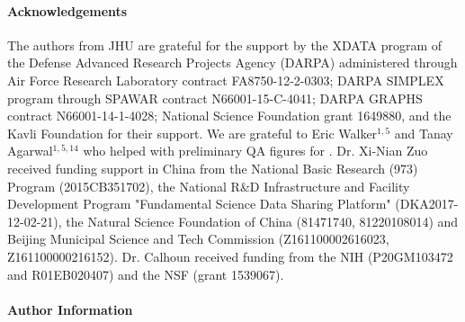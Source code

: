\documentclass[11pt]{article}
\begin{document}


\paragraph{Acknowledgements} 
{\small
The authors from JHU are grateful for the support  by the XDATA program of the Defense Advanced Research Projects Agency (DARPA) administered through Air
Force Research Laboratory contract FA8750-12-2-0303;  DARPA SIMPLEX
program through SPAWAR contract N66001-15-C-4041;  DARPA GRAPHS
contract N66001-14-1-4028; National Science Foundation grant 1649880, 
 and
the Kavli Foundation for their support. We are grateful to Eric Walker$^{1, 5}$ and Tanay Agarwal$^{1, 5, 14}$ who helped with preliminary QA figures for \ndmgf.
Dr. Xi-Nian Zuo received funding support in China from the National Basic Research (973) Program (2015CB351702), the National R{\&}D Infrastructure and Facility Development Program "Fundamental Science Data Sharing Platform" (DKA2017-12-02-21), the Natural Science Foundation of China (81471740, 81220108014) and Beijing Municipal Science and Tech Commission (Z161100002616023, Z161100000216152).
Dr. Calhoun received funding from the NIH (P20GM103472 and R01EB020407) and the NSF (grant 1539067). %
}

\paragraph{Author Information}
\end{document}
